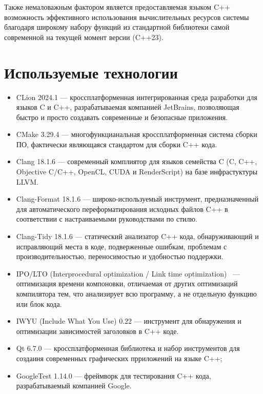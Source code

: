 Также немаловажным фактором является предоставляемая языком C++ возможность эффективного использования вычислительных ресурсов системы благодаря широкому набору функций из стандартной библиотеки самой современной на текущей момент версии (C++23).

\section{Используемые технологии}

\begin{itemize}
	\item CLion 2024.1 \cite{clion} — кроссплатформенная интегрированная среда разработки для языков C и C++, разрабатываемая компанией JetBrains, позволяющая быстро и просто создавать современные и безопасные приложения.
	\item CMake 3.29.4 \cite{cmake} — многофункцианальная кроссплатформенная система сборки ПО, фактически являющаяся стандартом для сборки C++ кода.
	\item Clang 18.1.6 \cite{clang} — современный комплиятор для языков семейства C (C, C++, Objective C/C++, OpenCL, CUDA и RenderScript) на базе инфрастуктуры LLVM.
	\item Clang-Format 18.1.6 \cite{clang-format} — широко-используемый инструмент, предназначенный для автоматического переформатирования исходных файлов C++ в соответствии с настраиваемыми руководствами по стилю.
	\item Clang-Tidy 18.1.6 \cite{clang-tidy} — статический анализатор C++ кода, обнаруживающий и исправляющий места в коде, подверженные ошибкам, проблемам с производительностью, переносимостью и удобностью поддержки.
	\item IPO/LTO (Interprocedural optimization / Link time optimization) \cite{ipo-lto}~— оптимизация времени компоновки, отличаемая от других оптимизаций компилятора тем, что анализирует всю программу, а не отдельную функцию или блок кода.
	\item IWYU (Include What You Use) 0.22 \cite{iwyu} — инструмент для обнаружения и оптимизации зависимостей заголовков в C++ коде.
	\item Qt 6.7.0 \cite{qt} — кроссплатформенная библиотека и набор инструментов для создаиня современных графических прриложений на языке C++;
	\item GoogleTest 1.14.0 \cite{googletest} — фреймворк для тестирования C++ кода, разрабатываемый компанией Google.
\end{itemize}

